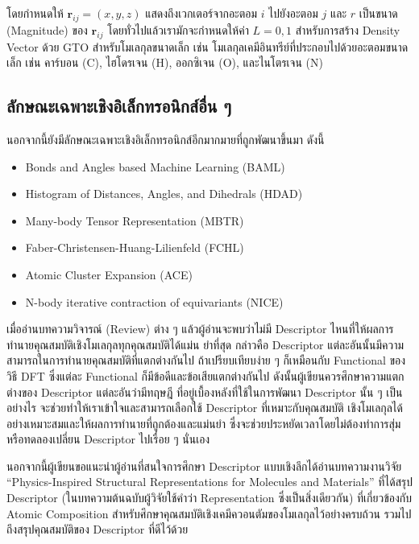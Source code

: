 \noindent โดยกำหนดให้ $\bm{r}_{ij} = (x,y,z)$ แสดงถึงเวกเตอร์จากอะตอม $i$ ไปยังอะตอม $j$ และ $r$ 
เป็นขนาด (Magnitude) ของ $\bm{r}_{ij}$ โดยทั่วไปแล้วเรามักจะกำหนดให้ค่า $L=0,1$ สำหรับการสร้าง Density Vector 
ด้วย GTO สำหรับโมเลกุลขนาดเล็ก เช่น โมเลกุลเคมีอินทรีย์ที่ประกอบไปด้วยอะตอมขนาดเล็ก เช่น คาร์บอน (C), ไฮโดรเจน (H), ออกซิเจน 
(O), และไนโตรเจน (N)\autocite{kwac2021}

\subsection{ลักษณะเฉพาะเชิงอิเล็กทรอนิกส์อื่น ๆ}
\label{ssec:other_feat_elec}

นอกจากนี้ยังมีลักษณะเฉพาะเชิงอิเล็กทรอนิกส์อีกมากมายที่ถูกพัฒนาขึ้นมา\autocite{faber2018} ดังนี้ 

\begin{itemize}[topsep=0pt]
    \item Bonds and Angles based Machine Learning (BAML)\autocite{huang2016}

    \item Histogram of Distances, Angles, and Dihedrals (HDAD)\autocite{faber2017}

    \item Many-body Tensor Representation (MBTR)\autocite{huo2022,langer2022}
    
    \item Faber-Christensen-Huang-Lilienfeld (FCHL)\autocite{faber2018}
    
    \item Atomic Cluster Expansion (ACE)\autocite{drautz2019,kovacs2021}
    
    \item N-body iterative contraction of equivariants (NICE)\autocite{nigam2020}
\end{itemize}

เมื่ออ่านบทความวิจารณ์ (Review) ต่าง ๆ แล้วผู้อ่านจะพบว่าไม่มี Descriptor ไหนที่ให้ผลการทำนายคุณสมบัติเชิงโมเลกุลทุกคุณสมบัติได้แม่น%
ยำที่สุด กล่าวคือ Descriptor แต่ละอันนั้นมีความสามารถในการทำนายคุณสมบัติที่แตกต่างกันไป ถ้าเปรียบเทียบง่าย ๆ ก็เหมือนกับ Functional 
ของวิธี DFT ซึ่งแต่ละ Functional ก็มีข้อดีและข้อเสียแตกต่างกันไป ดังนั้นผู้เขียนควรศึกษาความแตกต่างของ Descriptor แต่ละอันว่ามีทฤษฎี%
ที่อยู่เบื้องหลังที่ใช้ในการพัฒนา Descriptor นั้น ๆ เป็นอย่างไร จะช่วยทำให้เราเข้าใจและสามารถเลือกใช้ Descriptor ที่เหมาะกับคุณสมบัติ%
เชิงโมเลกุลได้อย่างเหมาะสมและให้ผลการทำนายที่ถูกต้องและแม่นยำ ซึ่งจะช่วยประหยัดเวลาโดยไม่ต้องทำการสุ่มหรือทดลองเปลี่ยน Descriptor 
ไปเรื่อย ๆ นั่นเอง

นอกจากนี้ผู้เขียนขอแนะนำผู้อ่านที่สนใจการศึกษา Descriptor แบบเชิงลึกได้อ่านบทความงานวิจัย \enquote{Physics-Inspired Structural 
Representations for Molecules and Materials}\autocite{musil2021} ที่ได้สรุป Descriptor (ในบทความต้นฉบับผู้วิจัยใช้คำว่า 
Representation ซึ่งเป็นสิ่งเดียวกัน) ที่เกี่ยวข้องกับ Atomic Composition สำหรับศึกษาคุณสมบัติเชิงเคมีควอนตัมของโมเลกุลไว้อย่างครบถ้วน 
รวมไปถึงสรุปคุณสมบัติของ Descriptor ที่ดีไว้ด้วย
